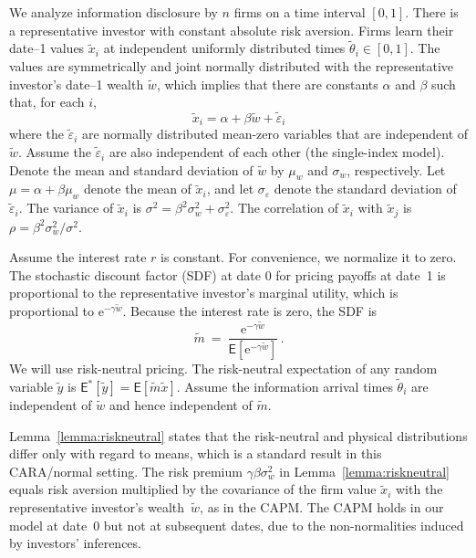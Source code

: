 \documentclass[ecta,nameyear,draft]{econsocart}
\theoremstyle{theorem}
\numberwithin{lemma}{section}
\numberwithin{proposition}{section}
\numberwithin{equation}{section}
\numberwithin{figure}{section}
\newcommand{\E}{\mathrm{e}}
\newcommand{\mye}{\ensuremath{\mathsf{E}}}
\begin{document}
We analyze information disclosure by $n$ firms on a time interval $[0,1]$.  There is a representative investor with constant absolute risk aversion.
Firms learn their date--1 values $\tilde x_i$ at independent uniformly distributed times $\tilde \theta_i \in [0,1]$.  The values are symmetrically and joint normally distributed with the representative investor's date--1 wealth $\tilde w$, which implies that there are constants $\alpha$ and $\beta$ such that, for each $i$,
\begin{equation}
  \tilde x_i =  \alpha + \beta  \tilde w + \tilde \varepsilon_i
\end{equation} 
where the $\tilde \varepsilon_i$ are normally distributed mean-zero variables that are independent of $ \tilde w$.  Assume the $\tilde \varepsilon_i$ are also independent of each other (the single-index model).   Denote the mean and standard deviation of $\tilde w$ by $\mu_w$ and $\sigma_w$, respectively.
Let $\mu= \alpha + \beta \mu_w$ denote the mean of $\tilde x_i$, and let  $\sigma_\varepsilon$ denote the standard deviation of $\tilde \varepsilon_i$.  The variance of $\tilde x_i$ is $\sigma^2 =  \beta^2\sigma_w^2 + \sigma_\varepsilon^2$.  
The correlation of $\tilde x_i$ with $\tilde x_j$ is $\rho = \beta^2\sigma_w^2/\sigma^2$.

Assume the interest rate $r$ is constant.  For convenience, we normalize it to zero.
The stochastic discount factor (SDF) at date 0 for pricing payoffs at date~1 is proportional to the representative investor's marginal utility, which is proportional to  $\E^{-\gamma \tilde w}$.  Because the interest rate is zero, the SDF is 
\begin{equation}
 \tilde m \ = \ \frac{\E^{-\gamma \tilde w}}{\mye[\E^{-\gamma \tilde w}]}\,.
\end{equation}
  We will use risk-neutral pricing.  The risk-neutral expectation of any random variable $\tilde y$ is $\mye^*[\tilde y] = \mye[\tilde m\tilde x]$.
  Assume the information arrival times $\tilde \theta_i$ are independent of $\tilde w$ and hence independent of $\tilde m$.
  
  Lemma~\ref{lemma:riskneutral} states that  the risk-neutral and physical distributions differ only with regard to means, which is a standard result in this CARA/normal setting. The risk premium $\gamma\beta\sigma_w^2$ in Lemma~\ref{lemma:riskneutral} equals risk aversion multiplied by the covariance of the firm value $\tilde x_i$ with the representative investor's wealth~$\tilde w$, as in the CAPM.  The CAPM holds in our model at date~0 but not at subsequent dates, due to the non-normalities induced by investors' inferences.
\end{document}
